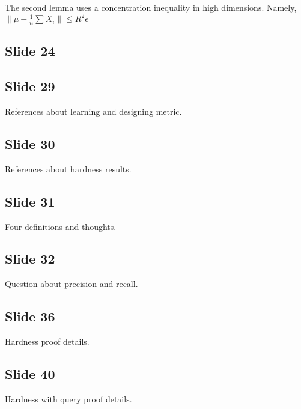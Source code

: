 \documentclass[12pt]{article}
\begin{document}
The second lemma uses a concentration inequality in high dimensions. Namely, $\|\mu - \frac{1}{n}\sum X_i\| \le R^2 \epsilon$ 
\subsection*{Slide 24}

\subsection*{Slide 29}
References about learning and designing metric.

\subsection*{Slide 30}
References about hardness results.

\subsection*{Slide 31}
Four definitions and thoughts.

\subsection*{Slide 32}
Question about precision and recall.

\subsection*{Slide 36}
Hardness proof details.

\subsection*{Slide 40}
Hardness with query proof details.
\end{document}
